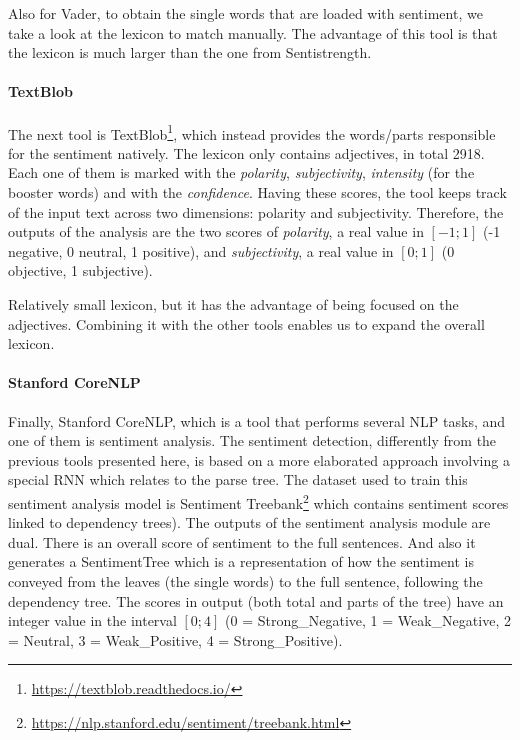 Also for Vader, to obtain the single words that are loaded with sentiment, we take a look at the lexicon to match manually. The advantage of this tool is that the lexicon is much larger than the one from Sentistrength.



\paragraph{TextBlob}
The next tool is TextBlob\footnote{\url{ https://textblob.readthedocs.io/}}, which instead provides the words/parts responsible for the sentiment natively.
The lexicon only contains adjectives, in total 2918. Each one of them is marked with the \emph{polarity}, \emph{subjectivity}, \emph{intensity} (for the booster words) and with the \emph{confidence}. Having these scores, the tool keeps track of the input text across two dimensions: polarity and subjectivity.
Therefore, the outputs of the analysis are the two scores of \emph{polarity}, a real value in $[-1;1]$ (-1 negative, 0 neutral, 1 positive), and \emph{subjectivity}, a real value in $[0;1]$ (0 objective, 1 subjective).

Relatively small lexicon, but it has the advantage of being focused on the adjectives. Combining it with the other tools enables us to expand the overall lexicon.


\paragraph{Stanford CoreNLP}
Finally, Stanford CoreNLP, which is a tool that performs several NLP tasks, and one of them is sentiment analysis. The sentiment detection, differently from the previous tools presented here, is based on a more elaborated approach involving a special RNN which relates to the parse tree. 
The dataset used to train this sentiment analysis model is Sentiment Treebank\footnote{\url{https://nlp.stanford.edu/sentiment/treebank.html}} which contains sentiment scores linked to dependency trees).
The outputs of the sentiment analysis module are dual. There is an overall score of sentiment to the full sentences. And also it generates a SentimentTree which is a representation of how the sentiment is conveyed from the leaves (the single words) to the full sentence, following the dependency tree.
The scores in output (both total and parts of the tree) have an integer value in the interval $[0;4]$ (0 = Strong\_Negative, 1 = Weak\_Negative, 2 = Neutral, 3 = Weak\_Positive, 4 = Strong\_Positive).

